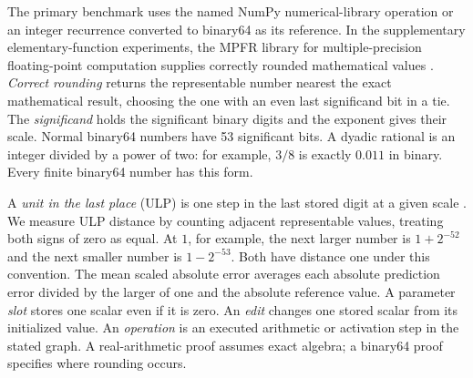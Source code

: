 The primary benchmark uses the named NumPy numerical-library operation or an integer recurrence converted to binary64 as its reference. In the supplementary elementary-function experiments, the MPFR library for multiple-precision floating-point computation supplies correctly rounded mathematical values \cite{mpfr}. \emph{Correct rounding} returns the representable number nearest the exact mathematical result, choosing the one with an even last significand bit in a tie. The \emph{significand} holds the significant binary digits and the exponent gives their scale. Normal binary64 numbers have 53 significant bits. A dyadic rational is an integer divided by a power of two: for example, $3/8$ is exactly $0.011$ in binary. Every finite binary64 number has this form.

A \emph{unit in the last place} (ULP) is one step in the last stored digit at a given scale \cite{goldberg1991}. We measure ULP distance by counting adjacent representable values, treating both signs of zero as equal. At $1$, for example, the next larger number is $1+2^{-52}$ and the next smaller number is $1-2^{-53}$. Both have distance one under this convention. The mean scaled absolute error averages each absolute prediction error divided by the larger of one and the absolute reference value. A parameter \emph{slot} stores one scalar even if it is zero. An \emph{edit} changes one stored scalar from its initialized value. An \emph{operation} is an executed arithmetic or activation step in the stated graph. A real-arithmetic proof assumes exact algebra; a binary64 proof specifies where rounding occurs.
